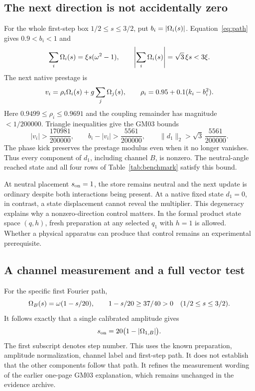 \subsection{The next direction is not accidentally zero}
For the whole first-step box \(1/2\le s\le3/2\), put \(b_i=|\Omega_i(s)|\). Equation~\eqref{eq:path} gives \(0.9<b_i<1\) and
\[
 \sum_i\Omega_i(s)=\xi s(\omega^2-1),\qquad
 \left|\sum_i\Omega_i(s)\right|=\sqrt3\,\xi s<3\xi.
\]
The next native prestage is
\[
 v_i=\rho_i\Omega_i(s)+g\sum_j\Omega_j(s),\qquad
 \rho_i=0.95+0.1(k_i-b_i^2).
\]
Here \(0.9499\le\rho_i\le0.9691\) and the coupling remainder has magnitude \(<1/200000\). Triangle inequalities give the GM03 bounds
\begin{equation}
 |v_i|>\frac{170981}{200000},\qquad
 b_i-|v_i|>\frac{5561}{200000},\qquad
 \|d_1\|_2>\sqrt3\,\frac{5561}{200000}.
 \label{eq:nonzero}
\end{equation}
The phase kick preserves the prestage modulus even when it no longer vanishes. Thus every component of \(d_1\), including channel \(B\), is nonzero. The neutral-angle reached state and all four rows of Table~\ref{tab:benchmark} satisfy this bound.

At neutral placement \(s_{\rm on}=1\), the store remains neutral and the next update is ordinary despite both interactions being present. At a native fixed state \(d_1=0\), in contrast, a state displacement cannot reveal the multiplier. This degeneracy explains why a nonzero-direction control matters. In the formal product state space \((q,h)\), fresh preparation at any selected \(q_1\) with \(h=1\) is allowed. Whether a physical apparatus can produce that control remains an experimental prerequisite.

\subsection{A channel measurement and a full vector test}
For the specific first Fourier path,
\[
 \Omega_B(s)=\omega(1-s/20),\qquad
 1-s/20\ge37/40>0 \quad (1/2\le s\le3/2).
\]
It follows exactly that a single calibrated amplitude gives
\begin{equation}
 s_{\rm on}=20\bigl(1-|\Omega_{1,B}|\bigr).
 \label{eq:amplitude}
\end{equation}
The first subscript denotes step number. This uses the known preparation, amplitude normalization, channel label and first-step path. It does not establish that the other components follow that path. It refines the measurement wording of the earlier one-page GM03 explanation, which remains unchanged in the evidence archive.

